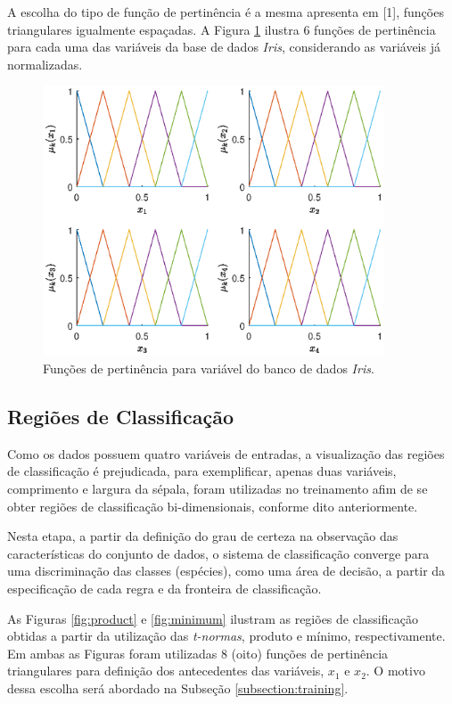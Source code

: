 \documentclass[12pt,a4paper]{article}
\numberwithin{equation}{section}
\begin{document}
A escolha do tipo de função de pertinência é a mesma apresenta em [1], funções triangulares igualmente espaçadas. A Figura \ref{fig:membership} ilustra $6$ funções de pertinência para cada uma das variáveis da base de dados \textit{Iris}, considerando as variáveis já normalizadas.

\begin{figure}[ht!]
\centering
\includegraphics[width=0.9\textwidth]{figures/membership.eps}
\caption{Funções de pertinência para variável do banco de dados \textit{Iris}.}
\label{fig:membership}
\end{figure}

\subsection{Regiões de Classificação}

Como os dados possuem quatro variáveis de entradas, a visualização das regiões de classificação é prejudicada, para exemplificar, apenas duas variáveis, comprimento e largura da sépala, foram utilizadas no treinamento afim de se obter regiões de classificação bi-dimensionais, conforme dito anteriormente.

Nesta etapa, a partir da definição do grau de certeza na observação das características do conjunto de dados, o sistema de classificação converge para uma discriminação das classes (espécies), como uma área de decisão, a partir da especificação de cada regra e da fronteira de classificação.

As Figuras \ref{fig:product} e \ref{fig:minimum} ilustram as regiões de classificação obtidas a partir da utilização das \textit{t-normas}, produto e mínimo, respectivamente. Em ambas as Figuras foram utilizadas $8$ (oito) funções de pertinência triangulares para definição dos antecedentes das variáveis, $x_1$ e $x_2$. O motivo dessa escolha será abordado na Subseção \ref{subsection:training}.
\end{document}
